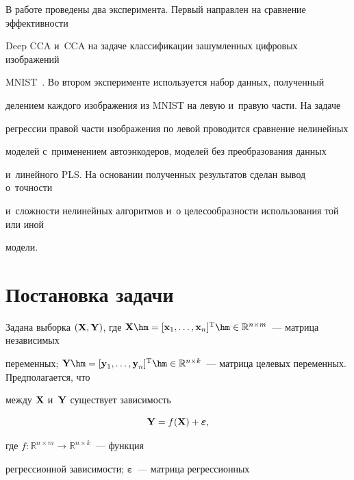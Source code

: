 {



}



В работе проведены два эксперимента. Первый направлен на сравнение эффективности 

Deep CCA и~CCA на задаче классификации зашумленных циф\-ро\-вых изображений 

MNIST~\cite{MNIST}. Во втором эксперименте используется набор данных, полученный 

делением каждого изображения из MNIST на левую и~правую части. На задаче 

регрессии правой части изображения по левой проводится сравнение нелинейных 

моделей с~применением автоэнкодеров, моделей без преобразования данных 

и~линейного PLS. На основании полученных результатов сделан вывод о~точ\-ности 

и~слож\-ности нелинейных алгоритмов и~о целесообразности использования той или иной 

модели.



\section{Постановка задачи}



Задана выборка $(\bX, \bY)$, где $\textbf{X} \hm= [\textbf{x}_1, \dots, 

\textbf{x}_{n}]^{\mathrm{T}} \hm\in \mathbb{R}^{n \times m}$~--- матрица независимых 

переменных; $\textbf{Y} \hm= [\textbf{y}_1, \dots, \textbf{y}_n]^{\mathrm{T}} \hm\in 

\mathbb{R}^{n \times k}$~--- матрица целевых переменных. Предполагается, что 

между $\mathbf{X}$ и~$\mathbf{Y}$ существует зависимость

\begin{equation}

    \bY = f(\bX) + \boldsymbol{\varepsilon},

    \label{eq:reg}

\end{equation}

где $f: \mathbb{R}^{n \times m} \to \mathbb{R}^{n \times k}$~--- функция 

регрессионной зависимости; $\boldsymbol{\varepsilon}$~--- матрица регрессионных 


